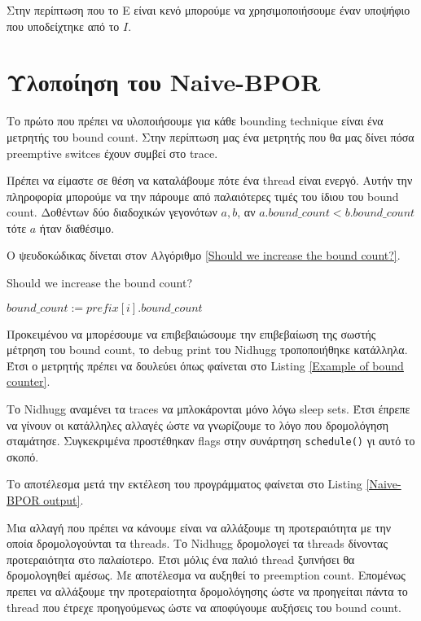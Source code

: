 Στην περίπτωση που το E είναι κενό μπορούμε να χρησιμοποιήσουμε έναν υποψήφιο που υποδείχτηκε από το $I$.

\section{Υλοποίηση του Naive-BPOR}

Το πρώτο που πρέπει να υλοποιήσουμε για κάθε bounding technique είναι ένα μετρητής του bound count. Στην περίπτωση 
μας ένα μετρητής που θα μας δίνει πόσα preemptive switces έχουν συμβεί στο trace.

Πρέπει να είμαστε σε θέση να καταλάβουμε πότε ένα thread είναι ενεργό. Αυτήν την πληροφορία μπορούμε να την πάρουμε
από παλαιότερες τιμές του ίδιου του bound count.
Δοθέντων δύο διαδοχικών γεγονότων $a,b$, αν $a.bound\_count < b.bound\_count$ τότε $a$ ήταν διαθέσιμο.

Ο ψευδοκώδικας δίνεται στον Αλγόριθμο \ref{Should we increase the bound count?}.

\begin{algorithm}
    \caption{Should we increase the bound count?}
    \label{Should we increase the bound count?}
    $bound\_count := prefix[i].bound\_count$  \;

\end{algorithm}


Προκειμένου να μπορέσουμε να επιβεβαιώσουμε την επιβεβαίωση της σωστής μέτρηση του bound count, το debug print του Nidhugg τροποποιήθηκε κατάλληλα.
Έτσι ο μετρητής πρέπει να δουλεύει όπως φαίνεται στο Listing \ref{Example of bound counter}.


Το Nidhugg αναμένει τα traces να μπλοκάρονται μόνο λόγω sleep sets. Έτσι έπρεπε να γίνουν οι κατάλληλες αλλαγές ώστε να γνωρίζουμε 
το λόγο που δρομολόγηση σταμάτησε. Συγκεκριμένα προστέθηκαν flags στην συνάρτηση \verb|schedule()| γι αυτό το σκοπό.

Το αποτέλεσμα μετά την εκτέλεση του προγράμματος φαίνεται στο Listing \ref{Naive-BPOR output}.


Μια αλλαγή που πρέπει να κάνουμε είναι να αλλάξουμε τη προτεραιότητα με την οποία δρομολογούνται τα threads. Το Nidhugg
δρομολογεί τα threads δίνοντας προτεραιότητα στο παλαίοτερο. Έτσι μόλις ένα παλιό thread ξυπνήσει θα δρομολογηθεί αμέσως.
Με αποτέλεσμα να αυξηθεί το preemption count. Επομένως πρεπει να αλλάξουμε την προτεραίοτητα δρομολόγησης ώστε να 
προηγείται πάντα το thread που έτρεχε προηγούμενως ώστε να αποφύγουμε αυξήσεις του bound count.

